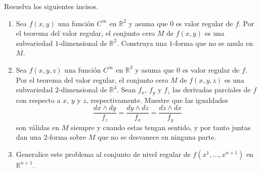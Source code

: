 \documentclass[12pt]{report}
\theoremstyle{largebreak}
\begin{document}
    \begin{excer}
        Resuelva los siguientes incisos.
        \begin{enumerate}
            \item Sea $f(x,y)$ una función $C^\infty$ en $\mathbb{R}^2$ y asuma que $0$ es valor regular de $f$. Por el teorema del valor regular, el conjunto cero $M$ de $f(x,y)$ es una subvariedad $1$-dimensional de $\mathbb{R}^2$. Construya una $1$-forma que no se anula en $M$.
            \item Sea $f(x,y,z)$ una función $C^\infty$ en $\mathbb{R}^3$ y asuma que $0$ es valor regular de $f$. Por el teorema del valor regular, el conjunto cero $M$ de $f(x,y,z)$ es una subvariedad $2$-dimensional de $\mathbb{R}^3$. Sean $f_x$, $f_y$ y $f_z$ las derivadas parciales de $f$ con respecto a $x$, $y$ y $z$, respectivamente. Muestre que las igualdades
            \begin{equation*}
                \frac{dx\wedge dy}{f_z}=\frac{dy\wedge dz}{f_x}=\frac{dz\wedge dx}{f_y}
            \end{equation*}
            son válidas en $M$ siempre y cuando estas tengan sentido, y por tanto juntas dan una $2$-forma sobre $M$ que no se desvanece en ninguna parte.
            \item Generalice este problema al conjunto de nivel regular de $f(x^1,\dots,x^{n+1})$ en $\mathbb{R}^{n+1}$.
        \end{enumerate}
    \end{excer}
\end{document}
